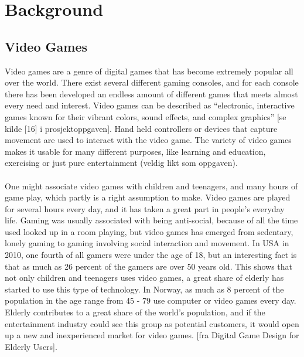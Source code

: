 \chapter{Background}
\section{Video Games}
Video games are a genre of digital games that has become extremely popular all over the world. There exist several different gaming consoles, and for each console there has been developed an endless amount of different games that meets almost every need and interest. Video games can be described as “electronic, interactive games known for their vibrant colors, sound effects, and complex graphics” [se kilde [16] i prosjektoppgaven]. Hand held controllers or devices that capture movement are used to interact with the video game. The variety of video games makes it usable for many different purposes, like learning and education, exercising or just pure entertainment (veldig likt som oppgaven). \\ \\
One might associate video games with children and teenagers, and many hours of game play, which partly is a right assumption to make. Video games are played for several hours every day, and it has taken a great part in people's everyday life. Gaming was usually associated with being anti-social, because of all the time used looked up in a room playing, but video games has emerged from sedentary, lonely gaming to gaming involving social interaction and movement. In USA in 2010, one fourth of all gamers were under the age of 18, but an interesting fact is that as much as 26 percent of the gamers are over 50 years old. This shows that not only children and teenagers uses video games, a great share of elderly has started to use this type of technology. In Norway,  as much as 8 percent of the population in the age range from 45 - 79 use computer or video games every day. Elderly contributes to a great share of the world's population, and if the entertainment industry could see this group as potential customers, it would open up a new and inexperienced market for video games. [fra Digital Game Design for Elderly Users]. 
